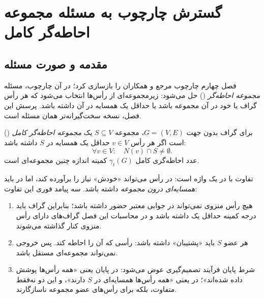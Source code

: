 \chapter{گسترش چارچوب به مسئله مجموعه احاطه‌گر کامل}
\label{ch:tdsp-extension}

\section{مقدمه و صورت مسئله}
\label{sec:tdsp-intro}

فصل چهارم چارچوب مرجع  و همکاران را بازسازی کرد؛ در آن چارچوب، مسئله
\emph{مجموعه احاطه‌گر} () حل می‌شود: زیرمجموعه‌ای از رأس‌ها انتخاب می‌شود
که هر رأس گراف یا خود در آن مجموعه باشد یا حداقل یک همسایه در آن داشته باشد.
پرسش این فصل، نسخه سخت‌گیرانه‌تر همان مسئله است.

\begin{definition}
\label{def:tds}
برای گراف بدون جهت $G=(V,E)$، مجموعه $S\subseteq V$ یک \emph{مجموعه احاطه‌گر کامل}
() است اگر هر رأس $v\in V$ حداقل یک همسایه در $S$ داشته باشد:
\begin{equation}
\forall v \in V:\quad N(v)\cap S \neq \emptyset .
\label{eq:tds-def}
\end{equation}
عدد احاطه‌گری کامل $\gamma_t(G)$ کمینه اندازه چنین مجموعه‌ای است.
\end{definition}

تفاوت با  در یک واژه است: در  رأس می‌تواند «خودش» نیاز را برآورده
کند، اما در  باید \emph{همسایه‌ای درون مجموعه} داشته باشد. سه پیامد
فوری این تفاوت:

\begin{enumerate}
  \item هیچ رأس منزوی نمی‌تواند در جوابی معتبر حضور داشته باشد؛ بنابراین گراف باید
        درجه کمینه حداقل یک داشته باشد و در محاسبات این فصل گراف‌های دارای رأس منزوی
        کنار گذاشته می‌شوند.
  \item هر عضو $S$ باید «پشتیبان» داشته باشد: رأسی که آن را احاطه کند. پس خروجی
        نمی‌تواند مجموعه‌ای مستقل باشد.
  \item شرط پایان فرآیند تصمیم‌گیری عوض می‌شود: در  پایان یعنی «همه رأس‌ها
        پوشش داده شده‌اند»؛ در  یعنی «همه رأس‌ها همسایه‌ای در $S$ دارند»،
        و این دو نه‌فقط متفاوت، بلکه برای رأس‌های عضو مجموعه ناسازگارند.
\end{enumerate}

